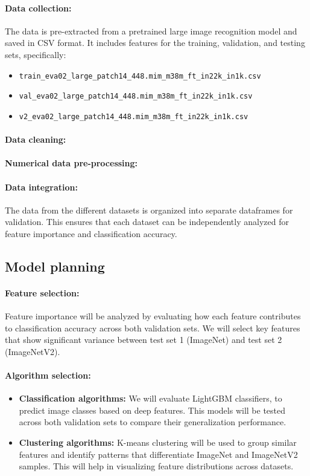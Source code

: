 \documentclass[a4paper,11pt]{article}
\begin{document}
\paragraph{Data collection:}  
The data is pre-extracted from a pretrained large image recognition model and saved in CSV format. It includes features for the training, validation, and testing sets, specifically:
\begin{itemize}
    \item \texttt{train\_eva02\_large\_patch14\_448.mim\_m38m\_ft\_in22k\_in1k.csv}
    \item \texttt{val\_eva02\_large\_patch14\_448.mim\_m38m\_ft\_in22k\_in1k.csv}
    \item \texttt{v2\_eva02\_large\_patch14\_448.mim\_m38m\_ft\_in22k\_in1k.csv}
\end{itemize}

\paragraph{Data cleaning:}  


\paragraph{Numerical data pre-processing:}  

\paragraph{Data integration:}  
The data from the different datasets is organized into separate dataframes for validation. This ensures that each dataset can be independently analyzed for feature importance and classification accuracy.

\subsection{Model planning}
\paragraph{Feature selection:}  
Feature importance will be analyzed by evaluating how each feature contributes to classification accuracy across both validation sets. We will select key features that show significant variance between test set 1 (ImageNet) and test set 2 (ImageNetV2).

\paragraph{Algorithm selection:}  
\begin{itemize}
    \item \textbf{Classification algorithms:} We will evaluate LightGBM classifiers, to predict image classes based on deep features. This models will be tested across both validation sets to compare their generalization performance.
    \item \textbf{Clustering algorithms:} K-means clustering will be used to group similar features and identify patterns that differentiate ImageNet and ImageNetV2 samples. This will help in visualizing feature distributions across datasets.
\end{itemize}
\end{document}
